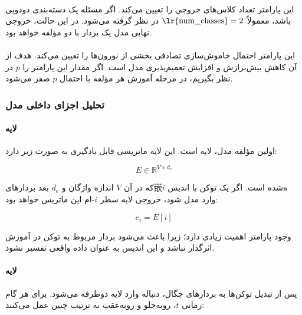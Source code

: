 \documentclass{article}
\begin{document}
\paragraph{}
این پارامتر تعداد کلاس‌های خروجی را تعیین می‌کند. اگر مسئله یک دسته‌بندی دودویی باشد، معمولاً \(\text{\lr{num\_classes}} = 2\) در نظر گرفته می‌شود. در این حالت، خروجی نهایی مدل یک بردار  با دو مؤلفه خواهد بود.

\paragraph{}
این پارامتر احتمال خاموش‌سازی تصادفی بخشی از نورون‌ها را تعیین می‌کند. هدف از آن کاهش بیش‌برازش و افزایش تعمیم‌پذیری مدل است. اگر مقدار این پارامتر را \(p\) در نظر بگیریم، در مرحله آموزش هر مؤلفه با احتمال \(p\) صفر می‌شود.

\subsubsection{تحلیل اجزای داخلی مدل}

\paragraph{لایه }
اولین مؤلفه مدل، لایه  است. این لایه ماتریسی قابل یادگیری به صورت زیر دارد:

\begin{equation}
	E \in \mathbb{R}^{V \times d_e}
\end{equation}

که در آن \(V\) اندازه واژگان و \(d_e\) بعد بردارهای嵌ه‌شده است. اگر یک توکن با اندیس \(i\) وارد مدل شود، خروجی لایه  سطر \(i\)-ام این ماتریس خواهد بود:

\begin{equation}
	e_i = E[i]
\end{equation}

وجود پارامتر  اهمیت زیادی دارد؛ زیرا باعث می‌شود بردار مربوط به توکن  در آموزش اثرگذار نباشد و این اندیس به عنوان داده واقعی تفسیر نشود.

\paragraph{لایه }
پس از تبدیل توکن‌ها به بردارهای چگال، دنباله وارد لایه  دوطرفه می‌شود. برای هر گام زمانی \(t\)،  رو‌به‌جلو و رو‌به‌عقب به ترتیب چنین عمل می‌کنند:
\end{document}
